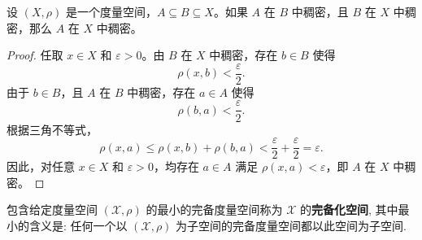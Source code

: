 \documentclass[../../main.tex]{subfiles}%
\begin{document}
\begin{proposition}[稠密子集的传递性]\label{proposition:稠密子集的传递性}
设 $(X,\rho)$ 是一个度量空间，$A \subseteq B \subseteq X$。如果 $A$ 在 $B$ 中稠密，且 $B$ 在 $X$ 中稠密，那么 $A$ 在 $X$ 中稠密。
\end{proposition}
\begin{proof}

任取 $x\in X$ 和 $\varepsilon>0$。由 $B$ 在 $X$ 中稠密，存在 $b\in B$ 使得
\[
\rho(x,b) < \frac{\varepsilon}{2}.
\]
由于 $b\in B$，且 $A$ 在 $B$ 中稠密，存在 $a\in A$ 使得
\[
\rho(b,a) < \frac{\varepsilon}{2}.
\]
根据三角不等式，
\[
\rho(x,a) \leqslant \rho(x,b) + \rho(b,a) < \frac{\varepsilon}{2} + \frac{\varepsilon}{2} = \varepsilon.
\]
因此，对任意 $x\in X$ 和 $\varepsilon>0$，均存在 $a\in A$ 满足 $\rho(x,a)<\varepsilon$，即 $A$ 在 $X$ 中稠密。
\end{proof}

\begin{definition}[完备化空间]
包含给定度量空间 $(\mathscr{X},\rho)$ 的最小的完备度量空间称为 $\mathscr{X}$ 的\textbf{完备化空间}, 其中最小的含义是: 任何一个以 $(\mathscr{X},\rho)$ 为子空间的完备度量空间都以此空间为子空间.
\end{definition}
\end{document}
